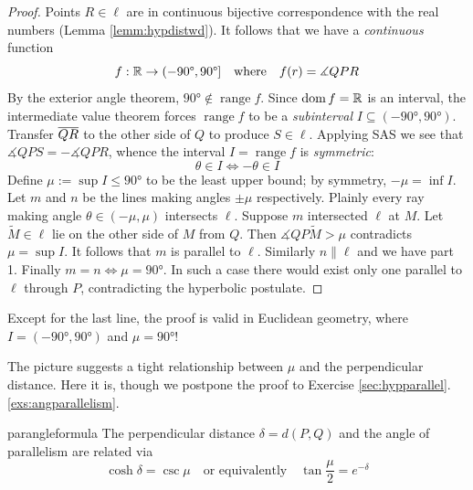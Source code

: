 \begin{proof}
Points $R\in\ell$ are in continuous bijective correspondence with the real numbers (Lemma \ref{lemm:hypdistwd}). It follows that we have a \emph{continuous} function
\[f:\R\to(-\ang{90},\ang{90}]\quad\text{where}\quad f(r)=\measuredangle QPR\]
By the exterior angle theorem, $\ang{90}\not\in\operatorname{range}f$. Since $\dom f=\R$ is an interval, the intermediate value theorem forces $\operatorname{range}f$ to be a \emph{subinterval} $I\subseteq(-\ang{90},\ang{90})$.\smallbreak
Transfer $\cl{QR}$ to the other side of $Q$ to produce $S\in\ell$. Applying SAS we see that $\measuredangle QPS=-\measuredangle QPR$, whence the interval $I=\operatorname{range}f$ is \emph{symmetric}:
\[\theta\in I\iff -\theta\in I\]
Define $\mu:=\sup I\le\ang{90}$ to be the least upper bound; by symmetry, $-\mu=\inf I$. Let $m$ and $n$ be the lines making angles $\pm\mu$ respectively. Plainly every ray making angle $\theta\in(-\mu,\mu)$ intersects $\ell$.\smallbreak
Suppose $m$ intersected $\ell$ at $M$. Let $\tilde M\in\ell$ lie on the other side of $M$ from $Q$. Then $\measuredangle QP\tilde M>\mu$ contradicts $\mu=\sup I$. It follows that $m$ is parallel to $\ell$. Similarly $n\parallel\ell$ and we have part 1.\smallbreak
Finally $m=n\iff \mu=\ang{90}$. In such a case there would exist only one parallel to $\ell$ through $P$, contradicting the hyperbolic postulate.
\end{proof}

Except for the last line, the proof is valid in Euclidean geometry, where $I=(-\ang{90},\ang{90})$ and $\mu=\ang{90}$!\medbreak\goodbreak


The picture suggests a tight relationship between $\mu$ and the perpendicular distance. Here it is, though we postpone the proof to Exercise \ref*{sec:hypparallel}.\ref{exs:angparallelism}.%

\goodbreak
\begin{cor}{}{parangleformula}
The perpendicular distance $\delta=d(P,Q)$ and the angle of parallelism are related via
\[\cosh\delta=\csc\mu\quad\text{or equivalently}\quad \tan\frac{\mu}2=e^{-\delta}\]
\end{cor}


